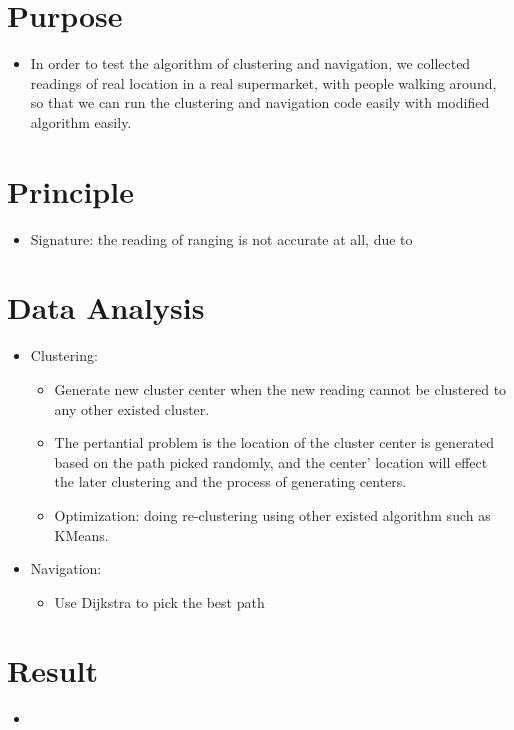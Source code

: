 \documentclass{article}
\begin{document}
\section{Purpose}
\begin{itemize}
\item In order to test the algorithm of clustering and navigation, we collected readings of real location in a real supermarket, with people walking around, so that we can run the clustering and navigation code easily with modified algorithm easily.
\end{itemize}

\section{Principle}
\begin{itemize}
\item Signature: the reading of ranging is not accurate at all, due to 
\end{itemize}

\section{Data Analysis}
\begin{itemize}
\item Clustering: 
	\begin{itemize}
	\item Generate new cluster center when the new reading cannot be clustered to any other existed cluster.
	\item The pertantial problem is the location of the cluster center is generated based on the path picked randomly, and the center' location will effect the later clustering and the process of generating centers.
	\item Optimization: doing re-clustering using other existed algorithm such as KMeans.
	\end{itemize}
\item Navigation: 
	\begin{itemize}
	\item Use Dijkstra to pick the best path
	\end{itemize}
\end{itemize}

\section{Result}
\begin{itemize}
\item 
\end{itemize}
\end{document}
